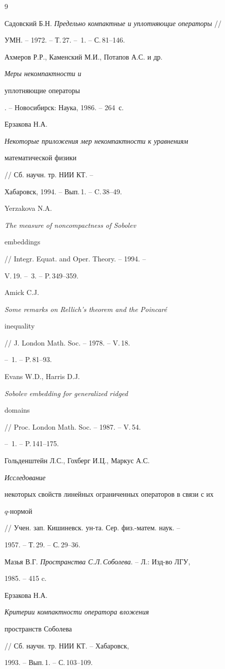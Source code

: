 \begin{thebibliography}{9}







Садовский Б.Н. {\em Предельно компактные и уплотняющие операторы} //


УМН. -- 1972. -- Т.\,27. -- \No\,1. -- С.\,81--146.




Ахмеров Р.Р., Каменский М.И., Потапов А.С. и др. {\em Меры некомпактности и 


уплотняющие операторы}. -- Новосибирск: Наука, 1986. -- 264~с.




Ерзакова Н.А. {\em Некоторые приложения мер некомпактности к уравнениям


математической физики} // Сб. научн. тр. НИИ КТ. --


Хабаровск, 1994. -- Вып.\,1. -- C.\,38--49.




Yerzakova N.A. {\em The measure of noncompactness of Sobolev


embeddings}// Integr. Equat. and Oper. Theory. -- 1994. --


V.\,19. -- \No\,3. -- P.\,349--359.




Amick C.J. {\em Some remarks on Rellich's theorem and the Poincar\'e


inequality} // J. London Math. Soc. -- 1978. -- V.\,18.


-- \No\,1. -- P.\,81--93.




Evans W.D., Harris D.J. {\em Sobolev embedding for generalized ridged


domains} // Proc. London Math. Soc. -- 1987. -- V.\,54.


-- \No\,1. -- P.\,141--175.




Гольденштейн Л.С., Гохберг И.Ц., Маркус А.С. {\em Исследование


некоторых свойств линейных ограниченных операторов в связи с их


$q$-нормой} // Учен. зап. Кишиневск. ун-та. Сер. физ.-матем. наук. --


1957. -- Т.\,29. -- С.\,29--36.




Мазья В.Г. {\em Пространства С.Л.\,Соболева}. -- Л.: Изд-во ЛГУ,


1985. -- 415 c.




Ерзакова Н.А. {\em Критерии компактности оператора вложения


пространств Соболева} // Сб. научн. тр. НИИ КТ. -- Хабаровск,


1993. -- Вып.\,1. -- С.\,103--109.





\end{thebibliography}





